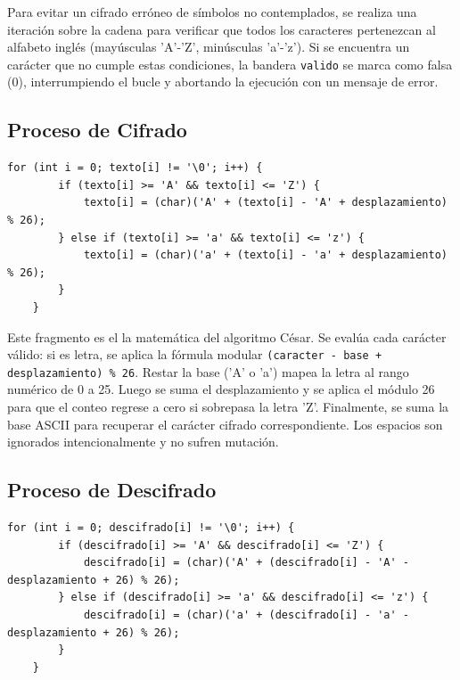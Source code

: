 \documentclass[12pt, letterpaper]{article}
\begin{document}
Para evitar un cifrado erróneo de símbolos no contemplados, se realiza una iteración sobre la cadena para verificar que todos los caracteres pertenezcan al alfabeto inglés (mayúsculas 'A'-'Z', minúsculas 'a'-'z'). Si se encuentra un carácter que no cumple estas condiciones, la bandera \texttt{valido} se marca como falsa (0), interrumpiendo el bucle y abortando la ejecución con un mensaje de error.

\subsection{Proceso de Cifrado}

\begin{lstlisting}[style=cstyle, caption={Proceso de cifrado del mensaje.}, label={lst:listing_3}]
    for (int i = 0; texto[i] != '\0'; i++) {
        if (texto[i] >= 'A' && texto[i] <= 'Z') {
            texto[i] = (char)('A' + (texto[i] - 'A' + desplazamiento) % 26);
        } else if (texto[i] >= 'a' && texto[i] <= 'z') {
            texto[i] = (char)('a' + (texto[i] - 'a' + desplazamiento) % 26);
        }
    }
\end{lstlisting}

Este fragmento es el la matemática del algoritmo César. Se evalúa cada carácter válido: si es letra, se aplica la fórmula modular \texttt{(caracter - base + desplazamiento) \% 26}. Restar la base ('A' o 'a') mapea la letra al rango numérico de 0 a 25. Luego se suma el desplazamiento y se aplica el módulo 26 para que el conteo regrese a cero si sobrepasa la letra 'Z'. Finalmente, se suma la base ASCII para recuperar el carácter cifrado correspondiente. Los espacios son ignorados intencionalmente y no sufren mutación.

\subsection{Proceso de Descifrado}

\begin{lstlisting}[style=cstyle, caption={Proceso de descifrado del mensaje.}, label={lst:listing_4}]
    for (int i = 0; descifrado[i] != '\0'; i++) {
        if (descifrado[i] >= 'A' && descifrado[i] <= 'Z') {
            descifrado[i] = (char)('A' + (descifrado[i] - 'A' - desplazamiento + 26) % 26);
        } else if (descifrado[i] >= 'a' && descifrado[i] <= 'z') {
            descifrado[i] = (char)('a' + (descifrado[i] - 'a' - desplazamiento + 26) % 26);
        }
    }
\end{lstlisting}
\end{document}
